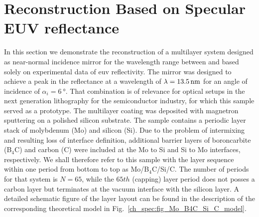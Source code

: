 \section{Reconstruction Based on Specular EUV reflectance} \label{ch_spec:sec_PTB17}
\label{ch_spec:sec_reconstruction_PTB17}
In this section we demonstrate the reconstruction of a multilayer system designed as near-normal incidence mirror for the wavelength range between  and  based solely on experimental data of \gls{euv} reflectivity. The mirror was designed to achieve a peak in the reflectance at a wavelength of $\lambda=\nm{13.5}$ for an angle of incidence of $\alpha_i = \SI{6}{\degree}$. That combination is of relevance for optical setups in the next generation lithography for the semiconductor industry, for which this sample served as a prototype. The multilayer coating was deposited with magnetron sputtering on a polished silicon substrate. The sample contains a periodic layer stack of molybdenum (Mo) and silicon (Si). Due to the problem of intermixing and resulting loss of interface definition, additional barrier layers of boroncarbite (B$_4$C) and carbon (C) were included at the Mo to Si and Si to Mo interfaces, respectively. We shall therefore refer to this sample with the layer sequence within one period from bottom to top as Mo/B$_4$C/Si/C. The number of periods for that system is $N=65$, while the $65th$ (capping) layer period does not posses a carbon layer but terminates at the vacuum interface with the silicon layer. A detailed schematic figure of the layer layout can be found in the description of the corresponding theoretical model in Fig.~\ref{ch_spec:fig_Mo_B4C_Si_C_model}.


